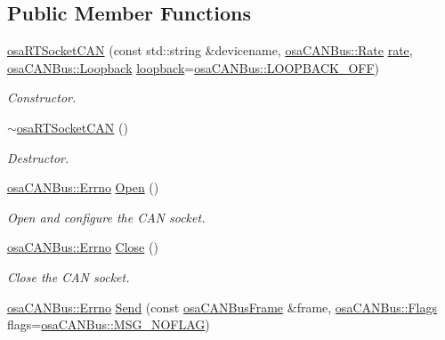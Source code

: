 \subsection*{Public Member Functions}
\begin{DoxyCompactItemize}
\item 
\hyperlink{classosa_r_t_socket_c_a_n_aeb6f32acd0d63e2cb60adda735b71b9e}{osa\+R\+T\+Socket\+C\+A\+N} (const std\+::string \&devicename, \hyperlink{classosa_c_a_n_bus_ae977dbc0e1c16772395408c8e018fe6c}{osa\+C\+A\+N\+Bus\+::\+Rate} \hyperlink{classosa_c_a_n_bus_a4ff86a9ecf19161b1f34666888e0a331}{rate}, \hyperlink{classosa_c_a_n_bus_a992406c83a336e95fb4a09b0b13df786}{osa\+C\+A\+N\+Bus\+::\+Loopback} \hyperlink{classosa_c_a_n_bus_a724e9c478dd48908882e29f189d98968}{loopback}=\hyperlink{classosa_c_a_n_bus_a992406c83a336e95fb4a09b0b13df786ae2557509d0c1ac68029eeb6bdf6e703d}{osa\+C\+A\+N\+Bus\+::\+L\+O\+O\+P\+B\+A\+C\+K\+\_\+\+O\+F\+F})
\begin{DoxyCompactList}\small\item\em Constructor. \end{DoxyCompactList}\item 
\hyperlink{classosa_r_t_socket_c_a_n_a8f80713456b4c1f7514030f8cd320af7}{$\sim$osa\+R\+T\+Socket\+C\+A\+N} ()
\begin{DoxyCompactList}\small\item\em Destructor. \end{DoxyCompactList}\item 
\hyperlink{classosa_c_a_n_bus_a6fa3e95ec4c36932d0640e40e0748fde}{osa\+C\+A\+N\+Bus\+::\+Errno} \hyperlink{classosa_r_t_socket_c_a_n_a68885fe9f90ca673958caaa6f0e4a251}{Open} ()
\begin{DoxyCompactList}\small\item\em Open and configure the C\+A\+N socket. \end{DoxyCompactList}\item 
\hyperlink{classosa_c_a_n_bus_a6fa3e95ec4c36932d0640e40e0748fde}{osa\+C\+A\+N\+Bus\+::\+Errno} \hyperlink{classosa_r_t_socket_c_a_n_a74c55b778afb9a7ae633f3714d99003c}{Close} ()
\begin{DoxyCompactList}\small\item\em Close the C\+A\+N socket. \end{DoxyCompactList}\item 
\hyperlink{classosa_c_a_n_bus_a6fa3e95ec4c36932d0640e40e0748fde}{osa\+C\+A\+N\+Bus\+::\+Errno} \hyperlink{classosa_r_t_socket_c_a_n_aa1f62bdadfb3481ca3f96a8152e22508}{Send} (const \hyperlink{classosa_c_a_n_bus_frame}{osa\+C\+A\+N\+Bus\+Frame} \&frame, \hyperlink{classosa_c_a_n_bus_a74fe35c6059237887431f3ccece7b21b}{osa\+C\+A\+N\+Bus\+::\+Flags} flags=\hyperlink{classosa_c_a_n_bus_a74fe35c6059237887431f3ccece7b21ba30f701fa6e0dba6e274540941ccd3978}{osa\+C\+A\+N\+Bus\+::\+M\+S\+G\+\_\+\+N\+O\+F\+L\+A\+G})

\end{DoxyCompactItemize}
